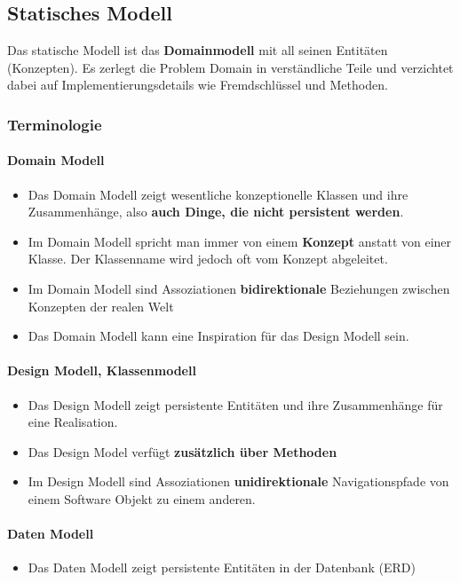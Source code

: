\clearpage

\subsection{Statisches Modell}
Das statische Modell ist das \textbf{Domainmodell} mit all seinen Entitäten (Konzepten). Es zerlegt die Problem Domain in verständliche Teile und verzichtet dabei auf Implementierungsdetails wie Fremdschlüssel und Methoden.


\subsubsection{Terminologie}
\paragraph{Domain Modell} \hfill
\begin{itemize}
	\item Das Domain Modell zeigt wesentliche konzeptionelle Klassen und ihre Zusammenhänge, also \textbf{auch Dinge, die nicht persistent werden}.
	\item Im Domain Modell spricht man immer von einem \textbf{Konzept} anstatt von einer Klasse. Der Klassenname wird jedoch oft vom Konzept abgeleitet.
	\item Im Domain Modell sind Assoziationen \textbf{bidirektionale} Beziehungen zwischen Konzepten der realen Welt
	\item Das Domain Modell kann eine Inspiration für das Design Modell sein.
\end{itemize}

\paragraph{Design Modell, Klassenmodell} \hfill
\begin{itemize}
	\item Das Design Modell zeigt persistente Entitäten und ihre Zusammenhänge für eine Realisation.
	\item Das Design Model verfügt \textbf{zusätzlich über Methoden}
	\item Im Design Modell sind Assoziationen \textbf{unidirektionale} Navigationspfade von einem Software Objekt zu einem anderen.
\end{itemize}

\paragraph{Daten Modell} \hfill
\begin{itemize}
	\item Das Daten Modell zeigt persistente Entitäten in der Datenbank (ERD)
\end{itemize}

